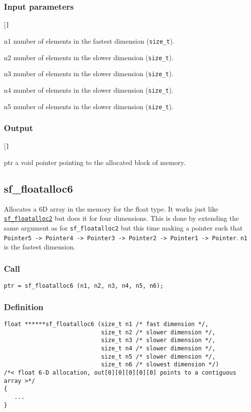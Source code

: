 \subsubsection*{Input parameters}
\begin{desclist}{\tt }{\quad}[\tt ]
   \setlength\itemsep{0pt}
   \item[n1] number of elements in the fastest dimension (\texttt{size\_t}).
   \item[n2] number of elements in the slower dimension (\texttt{size\_t}).
   \item[n3] number of elements in the slower dimension (\texttt{size\_t}).
   \item[n4] number of elements in the slower dimension (\texttt{size\_t}).
   \item[n5] number of elements in the slower dimension (\texttt{size\_t}).
\end{desclist}

\subsubsection*{Output}
\begin{desclist}{\tt }{\quad}[\tt ]
   \setlength\itemsep{0pt}
   \item[ptr] a void pointer pointing to the allocated block of memory.
\end{desclist}




\subsection{{sf\_floatalloc6}}
Allocates a 6D array in the memory for the float type. It works just like \hyperref[sec:sf_floatalloc2]{\texttt{sf\_floatalloc2}} but does it for four dimensions. This is done by extending the same argument as for \texttt{sf\_floatalloc2} but this time making a pointer such that \texttt{Pointer5 -> Pointer4 -> Pointer3 -> Pointer2 -> Pointer1 -> Pointer}. \texttt{n1} is the fastest dimension.

\subsubsection*{Call}
\begin{verbatim}ptr = sf_floatalloc6 (n1, n2, n3, n4, n5, n6);\end{verbatim}

\subsubsection*{Definition}
\begin{verbatim}
float ******sf_floatalloc6 (size_t n1 /* fast dimension */, 
                            size_t n2 /* slower dimension */, 
                            size_t n3 /* slower dimension */, 
                            size_t n4 /* slower dimension */,
                            size_t n5 /* slower dimension */,
                            size_t n6 /* slowest dimension */)
/*< float 6-D allocation, out[0][0][0][0][0] points to a contiguous array >*/ 
{
   ...
}
\end{verbatim}

